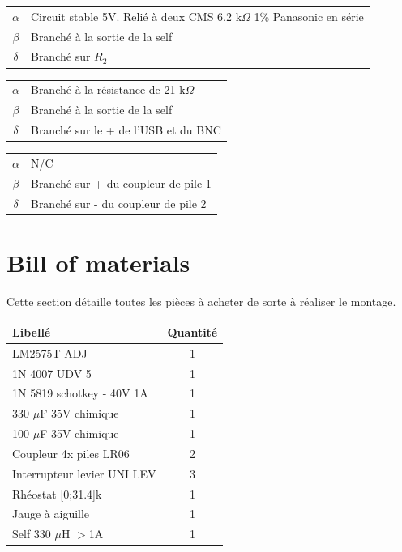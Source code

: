 \documentclass[12pt]{article}
\begin{document}
\begin{tabular}{|c|l|}
	\hline
	$\alpha$ 	& Circuit stable 5V. Relié à deux CMS 6.2 k$\Omega$ 1\% Panasonic en série	\\ \cline{1-1}
	$\beta$ 	& Branché à la sortie de la self						\\ \cline{1-1}
	$\delta$ 	& Branché sur $R_2$								\\ \cline{1-1}
	\hline
\end{tabular}\newline


\begin{tabular}{|c|l|}
	\hline
	$\alpha$ 	& Branché à la résistance de 21 k$\Omega$					\\ \cline{1-1}
	$\beta$ 	& Branché à la sortie de la self						\\ \cline{1-1}
	$\delta$ 	& Branché sur le + de l'USB et du BNC			 			\\ \cline{1-1}
	\hline
\end{tabular}\newline

\begin{tabular}{|c|l|}
	\hline
	$\alpha$ 	& N/C										\\ \cline{1-1}
	$\beta$ 	& Branché sur + du coupleur de pile 1						\\ \cline{1-1}
	$\delta$ 	& Branché sur - du coupleur de pile 2						\\ \cline{1-1}
	\hline
\end{tabular}\newline





\newpage
\section{Bill of materials}
Cette section détaille toutes les pièces à acheter de sorte à réaliser le montage.

\begin{center}
	\begin{tabular}{|l|c|}
		\hline
		Libellé				& Quantité	\\ \hline
		LM2575T-ADJ			& 1		\\
		1N 4007 UDV 5			& 1		\\
		1N 5819 schotkey - 40V 1A	& 1		\\
		330 $\mu$F 35V chimique		& 1		\\
		100 $\mu$F 35V chimique		& 1		\\
		Coupleur 4x piles LR06		& 2		\\
		Interrupteur levier UNI LEV	& 3		\\
		Rhéostat [0;31.4]k\footnotemark	& 1		\\
		Jauge à aiguille		& 1		\\
		Self 330 $\mu$H $>$1A		& 1		\\
		\hline
	\end{tabular}
\end{center}
\end{document}
